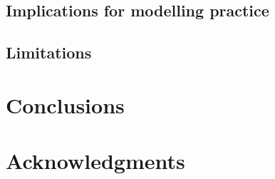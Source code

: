 \documentclass[a4paper,fleqn]{cas-dc}
\begin{document}
\subsection{Implications for modelling practice}


\subsection{Limitations}

\section{Conclusions}
\label{sec:conclusion}

\section*{Acknowledgments}   %
\end{document}
